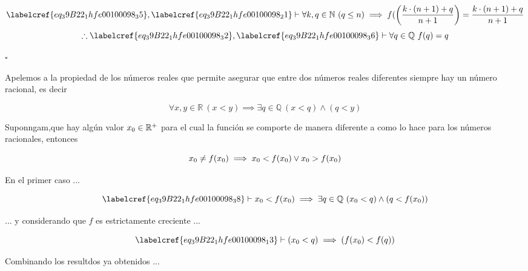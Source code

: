 \begin{equation} \label{eq_39B22_1hfe00100098_36}
	\labelcref{eq_39B22_1hfe00100098_35} , \labelcref{eq_39B22_1hfe00100098_21} \vdash \forall k,q \in \mathbb{N}\ (q \leq n) \implies f(\left(\frac{k \cdot (n+1) + q}{n+1}\right) = \frac{k \cdot (n+1) + q}{n+1}
\end{equation}
\begin{equation} \label{eq_39B22_1hfe00100098_37}
	\therefore \labelcref{eq_39B22_1hfe00100098_32}, \labelcref{eq_39B22_1hfe00100098_36} \vdash \forall q \in \mathbb{Q}\ f(q) = q
\end{equation}

\hfill $\square$

Apelemos a la propiedad de los números reales que permite asegurar que entre dos números reales diferentes siempre hay un número racional, es decir 

\begin{equation} \label{eq_39B22_1hfe00100098_38}
	\forall x,y \in \mathbb{R}\ (x < y) \implies  \exists q \in \mathbb{Q}\ (x < q) \land (q < y)
\end{equation}

Suponngam,que hay algún valor $x\textsubscript{0} \in \mathbb{R}^{+}$ para el cual la función se comporte de manera diferente a como lo hace para los números racionales, entonces

\begin{equation} \label{eq_39B22_1hfe00100098_39}
	x\textsubscript{0} \neq f(x\textsubscript{0}) \implies x\textsubscript{0} < f(x\textsubscript{0}) \lor x\textsubscript{0} > f(x\textsubscript{0})
\end{equation}

En el primer caso ...

\begin{equation} \label{eq_39B22_1hfe00100098_40}
	 \labelcref{eq_39B22_1hfe00100098_38} \vdash x\textsubscript{0} < f(x\textsubscript{0}) \implies  \exists q \in \mathbb{Q}\ (x\textsubscript{0} < q) \land (q < f(x\textsubscript{0}))
\end{equation}

... y considerando que $f$ es estrictamente creciente ...

\begin{equation} \label{eq_39B22_1hfe00100098_41}
	\labelcref{eq_39B22_1hfe00100098_13} \vdash (x\textsubscript{0} < q) \implies (f(x\textsubscript{0}) < f(q))
\end{equation}

Combinando los resultdos ya obtenidos ...

